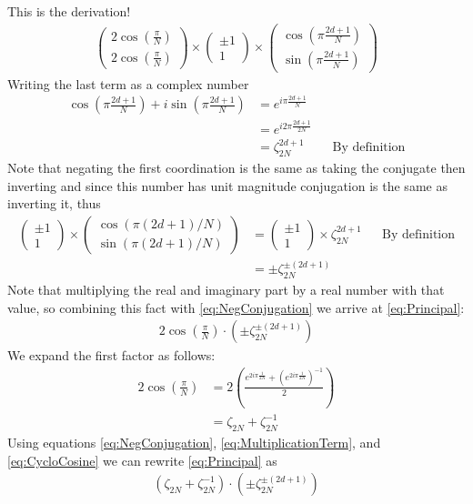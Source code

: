 \documentclass{article}
\begin{document}
This is the derivation!
\begin{align}
	\begin{pmatrix}
		2\cos\left(\frac{\pi}{N}\right) \\
		2\cos\left(\frac{\pi}{N}\right)
	\end{pmatrix}
	\times
	\begin{pmatrix}
		\pm 1 \\
		1
	\end{pmatrix}
	\times
	\begin{pmatrix}
		\cos\left(\pi\textstyle\frac{2d+1}{N}\right) \\
		\sin\left(\pi\textstyle\frac{2d+1}{N}\right)
	\end{pmatrix}
	\label{eq:Principal}
\end{align}
Writing the last term as a complex number 
\begin{align}
	\cos\left(\pi\frac{2d+1}{N}\right) + 
	i\sin\left(\pi\frac{2d+1}{N}\right)
	&= e^{i\pi\frac{2d+1}{N}}  \nonumber\\
	&=e^{i2\pi\frac{2d+1}{2N}} \nonumber\\
	&=\zeta_{2N}^{2d + 1} && \text{By definition}
\end{align}
Note that negating the first coordination is the same as taking the conjugate then inverting and since this number has unit magnitude conjugation is the same as inverting it, thus
\begin{align}
	\begin{pmatrix}
		\pm 1 \\
		1
	\end{pmatrix}
	\times
	\begin{pmatrix}
		\cos(\pi(2d+1)/N) \\
		\sin(\pi(2d+1)/N)
	\end{pmatrix}
	&= 
	\begin{pmatrix}
		\pm 1 \\
		1
	\end{pmatrix}
	\times
	\zeta_{2N}^{2d + 1} && \text{By definition}\nonumber \\
	&= \pm\zeta_{2N}^{\pm (2d + 1)}
	\label{eq:NegConjugation}
\end{align}
Note that multiplying the real and imaginary part by a real number with that value, so combining this fact with \eqref{eq:NegConjugation} we arrive at \eqref{eq:Principal}:
\begin{align}
	2\cos\left(\frac{\pi}{N}\right)\cdot\left(\pm\zeta_{2N}^{\pm (2d + 1)}\right)
	\label{eq:MultiplicationTerm}
\end{align}
We expand the first factor as follows:
\begin{align}
	2\cos\left(\frac{\pi}{N}\right) &= 2\left(\frac{e^{2i\pi\frac{1}{2N}} + \left(e^{2i\pi\frac{1}{2N}}\right)^{-1}}{2}\right) \nonumber
	\\ &=\zeta_{2N} + \zeta_{2N}^{-1} \label{eq:CycloCosine}
\end{align}
Using equations \eqref{eq:NegConjugation}, \eqref{eq:MultiplicationTerm}, and \eqref{eq:CycloCosine} we can rewrite \eqref{eq:Principal} as 
\begin{align}
	\left(\zeta_{2N} + \zeta_{2N}^{-1}\right)\cdot\left(\pm\zeta_{2N}^{\pm (2d + 1)}\right)
\end{align}
\end{document}
